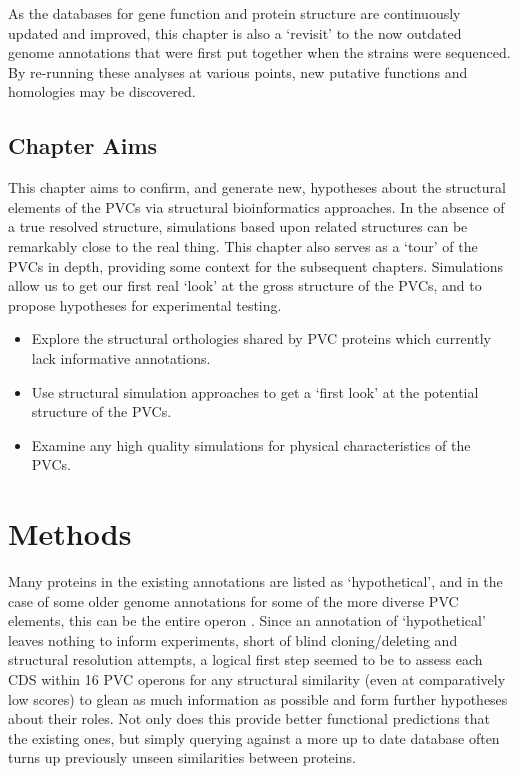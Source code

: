 As the databases for gene function and protein structure are continuously updated and improved, this chapter is also a `revisit' to the now outdated genome annotations that were first put together when the strains were sequenced. By re-running these analyses at various points, new putative functions and homologies may be discovered. 

\subsection*{Chapter Aims}
This chapter aims to confirm, and generate new, hypotheses about the structural elements of the PVCs via structural bioinformatics approaches. In the absence of a true resolved structure, simulations based upon related structures can be remarkably close to the real thing. This chapter also serves as a `tour' of the PVCs in depth, providing some context for the subsequent chapters. 
Simulations allow us to get our first real `look' at the gross structure of the PVCs, and to propose hypotheses for experimental testing.

\begin{itemize}
	\item Explore the structural orthologies shared by PVC proteins which currently lack informative annotations.
	\item Use structural simulation approaches to get a `first look' at the potential structure of the PVCs.
	\item Examine any high quality simulations for physical characteristics of the PVCs.

\end{itemize}


\section{Methods}
	Many proteins in the existing \Pa{} annotations are listed as `hypothetical', and in the case of some older genome annotations for some of the more diverse PVC elements, this can be the entire operon \citep{Duchaud2003}. Since an annotation of `hypothetical' leaves nothing to inform experiments, short of blind cloning/deleting and structural resolution attempts, a logical first step seemed to be to assess each CDS within 16 PVC operons for any structural similarity (even at comparatively low scores) to glean as much information as possible and form further hypotheses about their roles. Not only does this provide better functional predictions that the existing ones, but simply querying against a more up to date database often turns up previously unseen similarities between proteins.
	
